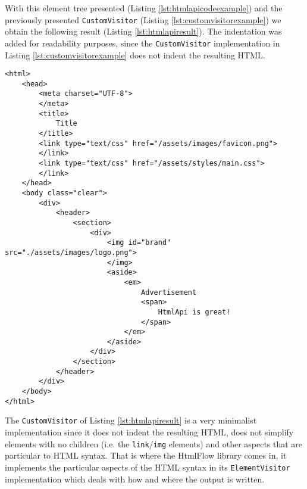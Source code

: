 \noindent
With this element tree presented (Listing \ref{lst:htmlapicodeexample}) and the previously presented \texttt{CustomVisitor} (Listing \ref{lst:customvisitorexample}) we obtain the following result (Listing \ref{lst:htmlapiresult}). The indentation was added for readability purposes, since the \texttt{CustomVisitor} implementation in Listing \ref{lst:customvisitorexample} does not indent the resulting \ac{HTML}.

\bigskip


\begin{minipage}{\linewidth}
\begin{lstlisting}[caption={HtmlApi Visitor Result},label={lst:htmlapiresult}]
<html>
    <head>
        <meta charset="UTF-8">
        </meta>
        <title>
            Title
        </title>
        <link type="text/css" href="/assets/images/favicon.png">
        </link>
        <link type="text/css" href="/assets/styles/main.css">
        </link>
    </head>
    <body class="clear">
        <div>
            <header>
                <section>
                    <div>
                        <img id="brand" src="./assets/images/logo.png">
                        </img>
                        <aside>
                            <em>
                                Advertisement
                                <span>
                                    HtmlApi is great!
                                </span>
                            </em>
                        </aside>
                    </div>
                </section>
            </header>
        </div>
    </body>
</html>                          
\end{lstlisting}
\end{minipage}

\noindent
The \texttt{CustomVisitor} of Listing \ref{lst:htmlapiresult} is a very minimalist implementation since it does not indent the resulting \ac{HTML}, does not simplify elements with no children (i.e. the \texttt{link}/\texttt{img} elements) and other aspects that are particular to \ac{HTML} syntax. That is where the HtmlFlow library comes in, it implements the particular aspects of the \ac{HTML} syntax in its \texttt{ElementVisitor} implementation which deals with how and where the output is written.